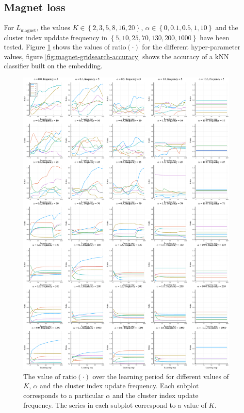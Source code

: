 \subsection{Magnet loss}
For \( L_\mathrm{magnet} \), the values \( K \in \left\{ 2, 3, 5, 8, 16, 20 \right\} \), \( \alpha \in \left\{ 0, 0.1, 0.5, 1, 10 \right\} \) and the cluster index upddate frequency in \( \left\{ 5, 10, 25, 70, 130, 200, 1000 \right\} \) have been tested. Figure \ref{fig:magnet-gridsearch-ratio} shows the values of \( \mathrm{ratio} \left( \cdot \right) \) for the different hyper-parameter values, figure \ref{fig:magnet-gridsearch-accuracy} shows the accuracy of a kNN classifier built on the embedding.

\begin{figure}[h]
  \centering
  \includegraphics[width=\textwidth]{images/magnet-gridsearch/ratio/K/magnet-gridsearch-ratio-K.pdf}
  \caption{The value of \( \mathrm{ratio} \left( \cdot \right) \) over the learning period for different values of \( K \), \( \alpha \) and the cluster index update frequency. Each subplot corresponds to a particular \( \alpha \) and the cluster index update frequency. The series in each subplot correspond to a value of \( K \).}\label{fig:magnet-gridsearch-ratio}
\end{figure}

